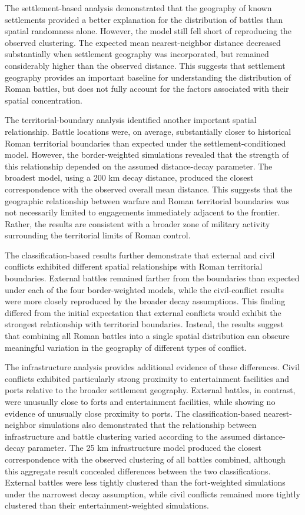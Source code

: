 \documentclass[
  letterpaper,
  DIV=11,
  numbers=noendperiod]{scrartcl}
\begin{document}
The settlement-based analysis demonstrated that the geography of known
settlements provided a better explanation for the distribution of
battles than spatial randomness alone. However, the model still fell
short of reproducing the observed clustering. The expected mean
nearest-neighbor distance decreased substantially when settlement
geography was incorporated, but remained considerably higher than the
observed distance. This suggests that settlement geography provides an
important baseline for understanding the distribution of Roman battles,
but does not fully account for the factors associated with their spatial
concentration.

The territorial-boundary analysis identified another important spatial
relationship. Battle locations were, on average, substantially closer to
historical Roman territorial boundaries than expected under the
settlement-conditioned model. However, the border-weighted simulations
revealed that the strength of this relationship depended on the assumed
distance-decay parameter. The broadest model, using a 200 km decay
distance, produced the closest correspondence with the observed overall
mean distance. This suggests that the geographic relationship between
warfare and Roman territorial boundaries was not necessarily limited to
engagements immediately adjacent to the frontier. Rather, the results
are consistent with a broader zone of military activity surrounding the
territorial limits of Roman control.

The classification-based results further demonstrate that external and
civil conflicts exhibited different spatial relationships with Roman
territorial boundaries. External battles remained farther from the
boundaries than expected under each of the four border-weighted models,
while the civil-conflict results were more closely reproduced by the
broader decay assumptions. This finding differed from the initial
expectation that external conflicts would exhibit the strongest
relationship with territorial boundaries. Instead, the results suggest
that combining all Roman battles into a single spatial distribution can
obscure meaningful variation in the geography of different types of
conflict.

The infrastructure analysis provides additional evidence of these
differences. Civil conflicts exhibited particularly strong proximity to
entertainment facilities and ports relative to the broader settlement
geography. External battles, in contrast, were unusually close to forts
and entertainment facilities, while showing no evidence of unusually
close proximity to ports. The classification-based nearest-neighbor
simulations also demonstrated that the relationship between
infrastructure and battle clustering varied according to the assumed
distance-decay parameter. The 25 km infrastructure model produced the
closest correspondence with the observed clustering of all battles
combined, although this aggregate result concealed differences between
the two classifications. External battles were less tightly clustered
than the fort-weighted simulations under the narrowest decay assumption,
while civil conflicts remained more tightly clustered than their
entertainment-weighted simulations.
\end{document}
